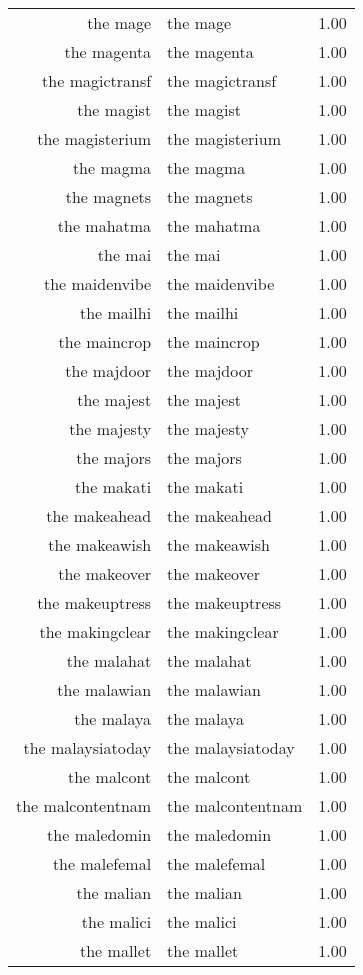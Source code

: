 \begin{table}[ht]
\begin{tabular}{rlr}
  the mage & the mage & 1.00 \\ 
  the magenta & the magenta & 1.00 \\ 
  the magictransf & the magictransf & 1.00 \\ 
  the magist & the magist & 1.00 \\ 
  the magisterium & the magisterium & 1.00 \\ 
  the magma & the magma & 1.00 \\ 
  the magnets & the magnets & 1.00 \\ 
  the mahatma & the mahatma & 1.00 \\ 
  the mai & the mai & 1.00 \\ 
  the maidenvibe & the maidenvibe & 1.00 \\ 
  the mailhi & the mailhi & 1.00 \\ 
  the maincrop & the maincrop & 1.00 \\ 
  the majdoor & the majdoor & 1.00 \\ 
  the majest & the majest & 1.00 \\ 
  the majesty & the majesty & 1.00 \\ 
  the majors & the majors & 1.00 \\ 
  the makati & the makati & 1.00 \\ 
  the makeahead & the makeahead & 1.00 \\ 
  the makeawish & the makeawish & 1.00 \\ 
  the makeover & the makeover & 1.00 \\ 
  the makeuptress & the makeuptress & 1.00 \\ 
  the makingclear & the makingclear & 1.00 \\ 
  the malahat & the malahat & 1.00 \\ 
  the malawian & the malawian & 1.00 \\ 
  the malaya & the malaya & 1.00 \\ 
  the malaysiatoday & the malaysiatoday & 1.00 \\ 
  the malcont & the malcont & 1.00 \\ 
  the malcontentnam & the malcontentnam & 1.00 \\ 
  the maledomin & the maledomin & 1.00 \\ 
  the malefemal & the malefemal & 1.00 \\ 
  the malian & the malian & 1.00 \\ 
  the malici & the malici & 1.00 \\ 
  the mallet & the mallet & 1.00 \\ 

\end{tabular}
\end{table}
